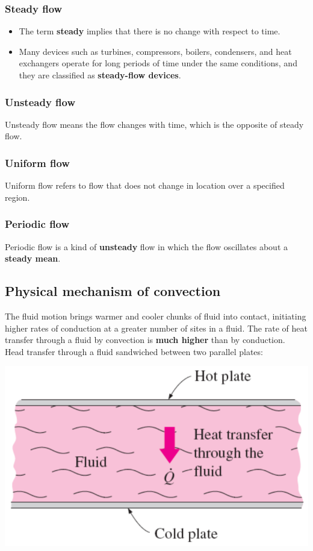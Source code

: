 \documentclass[11pt]{article}
\begin{document}
\subsubsection{Steady flow}
\label{sec:org9248c04}
\begin{itemize}
\item The term \textbf{steady} implies that there is no change with respect to time.
\item Many devices such as turbines, compressors, boilers, condensers, and heat exchangers operate for long periods of time under the same conditions, and they are classified as \textbf{steady-flow devices}.
\end{itemize}

\subsubsection{Unsteady flow}
\label{sec:org7e9e487}
Unsteady flow means the flow changes with time, which is the opposite of steady flow.

\subsubsection{Uniform flow}
\label{sec:org3888979}
Uniform flow refers to flow that does not change in location over a specified region.

\subsubsection{Periodic flow}
\label{sec:orgba0fa12}
Periodic flow is a kind of \textbf{unsteady} flow in which the flow oscillates about a \textbf{steady mean}.

 \newpage

\subsection{Physical mechanism of convection}
\label{sec:orgfb07b2e}
The fluid motion brings warmer and cooler chunks of fluid into contact, initiating higher rates of conduction at a greater number of sites in a fluid. The rate of heat transfer through a fluid by convection is \textbf{much higher} than by conduction.  \\

Head transfer through a fluid sandwiched between two parallel plates:
\begin{center}
\includegraphics[width=.9\linewidth]{./images/internal-flow-diagram.png}
\end{center}
\end{document}
